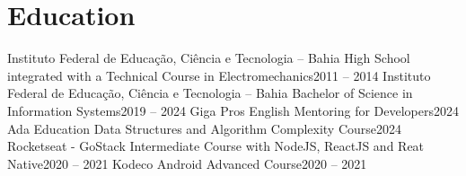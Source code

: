 \section{Education}
  \resumeSubHeadingListStart
    \resumeSubheading
      {Instituto Federal de Educação, Ciência e Tecnologia – Bahia}{}
      {High School integrated with a Technical Course in Electromechanics}{2011 -- 2014}
    \resumeSubheading
      {Instituto Federal de Educação, Ciência e Tecnologia – Bahia}{}
      {Bachelor of Science in Information Systems}{2019 -- 2024}
    \resumeSubheading
      {Giga Pros}{}
      {English Mentoring for Developers}{2024}
    \resumeSubheading
      {Ada Education}{}
      {Data Structures and Algorithm Complexity Course}{2024}
    \resumeSubheading
      {Rocketseat - GoStack}{}
      {Intermediate Course with NodeJS, ReactJS and Reat Native}{2020 -- 2021}
    \resumeSubheading
      {Kodeco}{}
      {Android Advanced Course}{2020 -- 2021}
  \resumeSubHeadingListEnd
